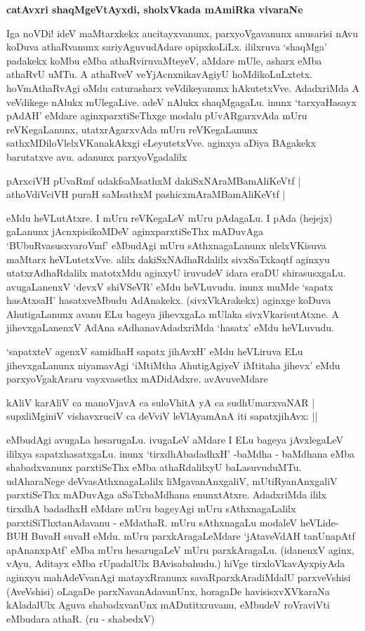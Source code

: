 {\bigskip
\noindent
{\large\bf catAvxri shaqMgeVtAyxdi, sholxVkada mAmiRka vivaraNe}}\label{page209a}
\medskip

\noindent
Iga noVDi! ideV maMtarxkekx aucitayxvanunx, parxyoVgavanunx anusarisi nAvu koDuva athaRvanunx sariyAguvudAdare opipxkoLiLx. ililxruva `shaqMga' padakekx koMbu eMba athaRviruvaMteyeV, aMdare mUle, asharx eMba athaRvU uMTu. A athaRveV veYjAcnxnikavAgiyU hoMdikoLuLxtetx. hoVmAthaRvAgi oMdu caturasharx veVdikeyanunx hAkutetxVve. AdadxriMda A veVdikege nAlukx mUlegaLive. adeV nAlukx shaqMgagaLu. inunx `tarxyaHasayx pAdAH' eMdare aginxparxtiSeThxge modalu pUvARgarxvAda mUru reVKegaLanunx, utatxrAgarxvAda mUru reVKegaLanunx sathxMDiloVlelxVKanakAkxgi eLeyutetxVve. aginxya aDiya BAgakekx barutatxve avu. adanunx parxyoVgadalilx

\smallskip
\begin{shloka}
pArxciVH pUvaRmf udakfsaMsathxM dakiSxNAraMBamAliKeVtf |\\\label{210}
athoVdiVciVH puraH saMsathxM pashicxmAraMBamAliKeVtf |
\end{shloka}
\smallskip

\noindent
eMdu heVLutAtxre. I mUru reVKegaLeV mUru pAdagaLu. I pAda (hejejx) gaLanunx jAcnxpisikoMDeV aginxparxtiSeThx mADuvAga `BUbuRvasusxvaroVmf' eMbudAgi mUru sAthxnagaLanunx ulelxVKisuva maMtarx heVLutetxVve. alilx dakiSxNAdhaRdalilx sivxSaTxkaqtf aginxyu utatxrAdhaRdalilx matotxMdu aginxyU iruvudeV idara eraDU shirasusxgaLu. avugaLanenxV `devxV shiVSeVR' eMdu heVLuvudu. inunx muMde `sapatx hasAtxsaH' hasatxveMbudu AdAnakekx. (sivxVkArakekx) aginxge koDuva AhutigaLanunx avanu ELu bageya jihevxgaLa mUlaka sivxVkarisutAtxne. A jihevxgaLanenxV AdAna sAdhanavAdadxriMda `hasatx' eMdu heVLuvudu.

`sapatxteV agenxV samidhaH sapatx jihAvxH'\label{210a} eMdu heVLiruva ELu jihevxgaLanunx niyamavAgi `iMtiMtha AhutigAgiyeV iMtitaha jihevx' eMdu parxyoVgakAraru vayxvasethx mADidAdxre. avAvuveMdare

\begin{shloka}
kAliV karAliV ca manoVjavA ca suloVhitA yA ca sudhUmarxvaNAR |\\\label{210b}
supxliMginiV vishavxruciV ca deVviV leVlAyamAnA iti sapatxjihAvx: ||
\end{shloka}

\noindent
eMbudAgi avugaLa hesarugaLu. ivugaLeV aMdare I ELu bageya jAvxlegaLeV ililxya sapatxhasatxgaLu. inunx `tirxdhAbadadhxH' -baMdha - baMdhana eMba shabadxvanunx parxtiSeThx eMba athaRdalilxyU baLasuvuduMTu. udAharaNege deVvasAthxnagaLalilx liMgavanAnxgaliV, mUtiRyanAnxgaliV parxtiSeThx mADuvAga aSaTxbaMdhana enunxtAtxre. AdadxriMda ililx tirxdhA badadhxH eMdare mUru bageyAgi mUru sAthxnagaLalilx parxtiSiThxtanAdavanu - eMdathaR. mUru sAthxnagaLu modaleV heVLide- BUH BuvaH suvaH eMdu. mUru parxkAragaLeMdare `jAtaveVdAH tanUnapAtf apAnanxpAtf' eMba mUru hesarugaLeV mUru parxkAragaLu. (idanenxV aginx, vAyu, Aditayx eMba rUpadalUlx BAvisabahudu.) hiVge tirxloVkavAyxpiyAda aginxyu mahAdeVvanAgi matayxRranunx savaRparxkAradiMdalU parxveVshisi (AveVshisi) oLagaDe parxNavanAdavanUnx, horagaDe havisisxvXVkaraNa kAladalUlx Aguva shabadxvanUnx mADutitxruvanu, eMbudeV roVraviVti eMbudara athaR. (ru - shabedxV)

